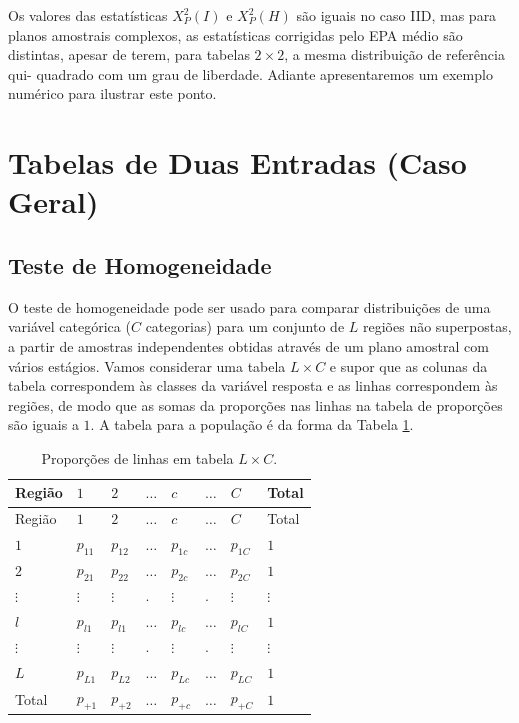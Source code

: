 \documentclass[]{book}
\theoremstyle{definition}
\theoremstyle{definition}
\theoremstyle{definition}
\theoremstyle{remark}
\begin{document}
Os valores das estatísticas \(X_{P}^{2}\left( I\right)\) e
\(X_{P}^{2}\left( H\right)\) são iguais no caso IID, mas para planos
amostrais complexos, as estatísticas corrigidas pelo EPA médio são
distintas, apesar de terem, para tabelas \(2\times 2\), a mesma
distribuição de referência qui- quadrado com um grau de liberdade.
Adiante apresentaremos um exemplo numérico para ilustrar este ponto.

\section{Tabelas de Duas Entradas (Caso
Geral)}\label{tabelas-de-duas-entradas-caso-geral}

\subsection{Teste de Homogeneidade}\label{teste-de-homogeneidade-1}

O teste de homogeneidade pode ser usado para comparar distribuições de
uma variável categórica (\(C\) categorias) para um conjunto de \(L\)
regiões não superpostas, a partir de amostras independentes obtidas
através de um plano amostral com vários estágios. Vamos considerar uma
tabela \(L\times C\) e supor que as colunas da tabela correspondem às
classes da variável resposta e as linhas correspondem às regiões, de
modo que as somas da proporções nas linhas na tabela de proporções são
iguais a \(1\). A tabela para a população é da forma da Tabela
\ref{tab:proplinha}.

\begin{longtable}[]{@{}llllllll@{}}
\caption{\label{tab:proplinha} Proporções de linhas em tabela
\(L\times C\).}\tabularnewline
\toprule
Região & \(1\) & \(2\) & \(\ldots\) & \(c\) & \(\ldots\) & \(C\) &
Total\tabularnewline
\midrule
\endfirsthead
\toprule
Região & \(1\) & \(2\) & \(\ldots\) & \(c\) & \(\ldots\) & \(C\) &
Total\tabularnewline
\midrule
\endhead
\(1\) & \(p_{11}\) & \(p_{12}\) & \(\ldots\) & \(p_{1c}\) & \(\ldots\) &
\(p_{1C}\) & \(1\)\tabularnewline
\(2\) & \(p_{21}\) & \(p_{22}\) & \(\ldots\) & \(p_{2c}\) & \(\ldots\) &
\(p_{2C}\) & \(1\)\tabularnewline
\(\vdots\) & \(\vdots\) & \(\vdots\) & . & \(\vdots\) & . & \(\vdots\) &
\(\vdots\)\tabularnewline
\(l\) & \(p_{l1}\) & \(p_{l1}\) & \(\ldots\) & \(p_{lc}\) & \(\ldots\) &
\(p_{lC}\) & \(1\)\tabularnewline
\(\vdots\) & \(\vdots\) & \(\vdots\) & . & \(\vdots\) & . & \(\vdots\) &
\(\vdots\)\tabularnewline
\(L\) & \(p_{L1}\) & \(p_{L2}\) & \(\ldots\) & \(p_{Lc}\) & \(\ldots\) &
\(p_{LC}\) & \(1\)\tabularnewline
Total & \(p_{+1}\) & \(p_{+2}\) & \(\ldots\) & \(p_{+c}\) & \(\ldots\) &
\(p_{+C}\) & \(1\)\tabularnewline
\bottomrule
\end{longtable}
\end{document}
